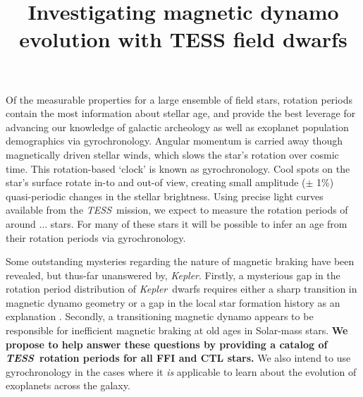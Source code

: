 \documentclass[letterpaper,12pt,preprint]{hack_aastex}
\newcommand{\Kepler}{{\it Kepler}}
\newcommand{\kepler}{\Kepler}
\newcommand{\TESS}{{\it TESS}}
\newcommand{\columbia}{1}
\newcommand{\ww}{2}
\newcommand{\cca}{3}
\newcommand{\florida}{4}
\newcommand{\princeton}{5}
\newcommand{\nsf}{4}
\newcommand{\simons}{2}
\newcommand{\hubble}{7}
\begin{document}
\title{Investigating magnetic dynamo evolution with TESS field dwarfs}




Of the measurable properties for a large ensemble of field stars, rotation
periods contain the most information about stellar age, and provide the best
leverage for advancing our knowledge of galactic archeology as well as
exoplanet population demographics via gyrochronology.
Angular momentum is carried away though magnetically driven stellar winds,
which slows the star's rotation over cosmic time.
This rotation-based `clock' is known as gyrochronology.
Cool spots on the star's surface rotate in-to and out-of view, creating small
amplitude ($\pm$ 1\%) quasi-periodic changes in the stellar brightness.
Using precise light curves available from the \TESS\ mission, we expect to
measure the rotation periods of around ... stars.
For many of these stars it will be possible to infer an age from their
rotation periods via gyrochronology.

Some outstanding mysteries regarding the nature of magnetic braking have been
revealed, but thus-far unanswered by, \kepler.
Firstly, a mysterious gap in the rotation period distribution of \Kepler\
dwarfs requires either a sharp transition in magnetic dynamo geometry or a gap
in the local star formation history as an explanation \citep{mcquillan2014,
davenport2017}.
Secondly, a transitioning magnetic dynamo appears to be responsible for
inefficient magnetic braking at old ages in Solar-mass stars.
{\bf We propose to help answer these questions by providing a catalog of \TESS\
rotation periods for all FFI and CTL stars.}
We also intend to use gyrochronology in the cases where it {\it is} applicable
to learn about the evolution of exoplanets across the galaxy.
\end{document}

